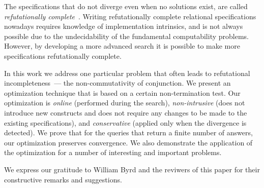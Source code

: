 The specifications that do not diverge even when no solutions exist, are called \emph{refutationally complete}~\cite{WillThesis}. Writing 
refutationally complete relational specifications nowadays requires knowledge of \miniKanren implementation intrinsics, and is not always
possible due to the undecidability of the fundamental computability problems. However, by developing a more advanced search it is possible
to make more specifications refutationally complete.

In this work we address one particular problem that often leads to refutational incompleteness~--- the non-commutativity of
conjunction. We present an optimization technique that is based on a certain non-termination test. Our optimization
is \emph{online} (performed during the search), \emph{non-intrusive} (does not introduce new constructs and does not require
any changes to be made to the existing specifications), and \emph{conservative} (applied only when the divergence
is detected). We prove that for the queries that return a finite number of answers, our optimization preserves convergence. 
We also demonstrate the application of the optimization for a number of interesting and important problems.

We express our gratitude to William Byrd and the reviwers of this paper for their constructive remarks and suggestions.

